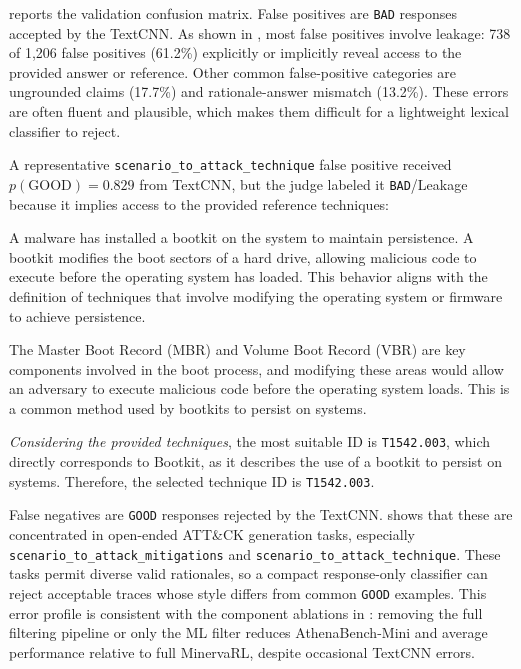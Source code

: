  reports the validation confusion matrix. False positives are \texttt{BAD} responses accepted by the TextCNN. As shown in , most false positives involve leakage: 738 of 1{,}206 false positives (61.2\%) explicitly or implicitly reveal access to the provided answer or reference. Other common false-positive categories are ungrounded claims (17.7\%) and rationale-answer mismatch (13.2\%). These errors are often fluent and plausible, which makes them difficult for a lightweight lexical classifier to reject.

A representative \texttt{scenario\_to\_attack\_technique} false positive received $p(\mathrm{GOOD})=0.829$ from TextCNN, but the judge labeled it \texttt{BAD}/Leakage because it implies access to the provided reference techniques:

\begin{tcolorbox}[breakable,colback=white,colframe=black!25,boxrule=0.4pt,arc=1pt,left=4pt,right=4pt,top=4pt,bottom=4pt]
\small
A malware has installed a bootkit on the system to maintain persistence.
A bootkit modifies the boot sectors of a hard drive, allowing malicious code to execute before the operating system has loaded.
This behavior aligns with the definition of techniques that involve modifying the operating system or firmware to achieve persistence.

The Master Boot Record (MBR) and Volume Boot Record (VBR) are key components involved in the boot process, and modifying these areas would allow an adversary to execute malicious code before the operating system loads.
This is a common method used by bootkits to persist on systems.

\emph{Considering the provided techniques}, the most suitable ID is \texttt{T1542.003}, which directly corresponds to Bootkit, as it describes the use of a bootkit to persist on systems.
Therefore, the selected technique ID is \texttt{T1542.003}.
\end{tcolorbox}

False negatives are \texttt{GOOD} responses rejected by the TextCNN.  shows that these are concentrated in open-ended ATT\&CK generation tasks, especially \texttt{scenario\_to\_attack\_mitigations} and \texttt{scenario\_to\_attack\_technique}. These tasks permit diverse valid rationales, so a compact response-only classifier can reject acceptable traces whose style differs from common \texttt{GOOD} examples. This error profile is consistent with the component ablations in : removing the full filtering pipeline or only the ML filter reduces AthenaBench-Mini and average performance relative to full MinervaRL, despite occasional TextCNN errors.

